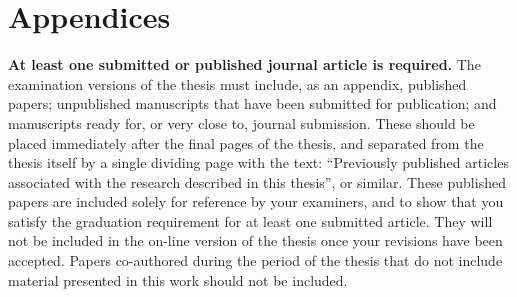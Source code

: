 

\chapter{Appendices} \label{appA}

\textbf{At least one submitted or published journal article is required.}  The examination versions of the thesis must include, as an appendix, published papers; unpublished manuscripts that have been submitted for publication; and manuscripts ready for, or very close to, journal submission.  These should be placed immediately after the final pages of the thesis, and separated from the thesis itself by a single dividing page with the text: ``Previously published articles associated with the research described in this thesis'', or similar. These published papers are included solely for reference by your examiners, and to show that you satisfy the graduation requirement for at least one submitted article.  They will not be included in the on-line version of the thesis once your revisions have been accepted. Papers co-authored during the period of the thesis that do not include material presented in this work should not be included.